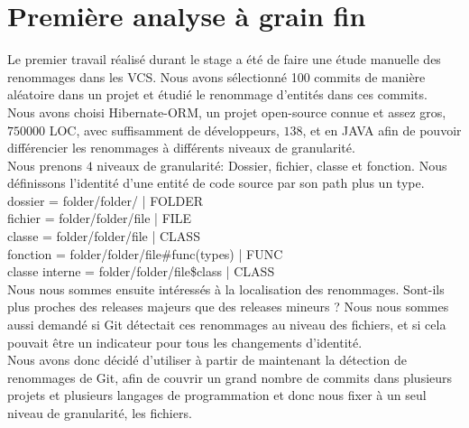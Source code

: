 \section{Première analyse à grain fin}
\label{sec:analyse_fin_grain}

Le premier travail réalisé durant le stage a été de faire une étude manuelle des renommages dans les VCS. Nous avons sélectionné 100 commits de manière aléatoire dans un projet et étudié le renommage d'entités dans ces commits.\\
Nous avons choisi Hibernate-ORM, un projet open-source connue et assez gros, $750000$ LOC, avec suffisamment de développeurs, $138$, et en JAVA afin de pouvoir différencier les renommages à différents niveaux de granularité.\\
Nous prenons $4$ niveaux de granularité: Dossier, fichier, classe et fonction. Nous définissons l'identité d'une entité de code source par son path plus un type. \\

dossier = folder/folder/ | FOLDER\\
fichier = folder/folder/file | FILE\\
classe = folder/folder/file | CLASS\\
fonction = folder/folder/file\#func(types) | FUNC\\
classe interne = folder/folder/file\$class | CLASS\\

Nous nous sommes ensuite intéressés à la localisation des renommages. Sont-ils plus proches des releases majeurs que des releases mineurs ? Nous nous sommes aussi demandé si Git détectait ces renommages au niveau des fichiers, et si cela pouvait être un indicateur pour tous les changements d'identité.\\
Nous avons donc décidé d'utiliser à partir de maintenant la détection de renommages de Git, afin de couvrir un grand nombre de commits dans plusieurs projets et plusieurs langages de programmation et donc nous fixer à un seul niveau de granularité, les fichiers.\\
